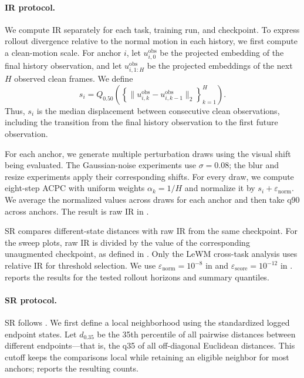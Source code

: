 \documentclass[10pt]{article}
\begin{document}
\paragraph{IR protocol.}
We compute IR separately for each task, training run, and checkpoint. To
express rollout divergence relative to the normal motion in each history, we
first compute a clean-motion scale. For anchor $i$, let
$u^{\mathrm{obs}}_{i,0}$ be the projected embedding of the final history
observation, and let $u^{\mathrm{obs}}_{i,1:H}$ be the projected embeddings of
the next $H$ observed clean frames. We define
\begin{equation}
s_i
=Q_{0.50}\!\left(
\left\{\|u^{\mathrm{obs}}_{i,k}-u^{\mathrm{obs}}_{i,k-1}\|_2
\right\}_{k=1}^{H}
\right).
\label{eq:clean-transition-scale}
\end{equation}
Thus, $s_i$ is the median displacement between consecutive clean observations,
including the transition from the final history observation to the first
future observation.

For each anchor, we generate multiple perturbation draws using the visual
shift being evaluated. The Gaussian-noise experiments use $\sigma=0.08$; the
blur and resize experiments apply their corresponding shifts. For every draw,
we compute eight-step ACPC with uniform weights $\alpha_k=1/H$ and normalize it
by $s_i+\varepsilon_{\mathrm{norm}}$. We average the normalized values across
draws for each anchor and then take q90 across anchors. The result is raw IR in
.

SR compares different-state distances with raw IR from the same checkpoint.
For the sweep plots, raw IR is divided by the value of the corresponding
unaugmented checkpoint, as defined in . Only the LeWM
cross-task analysis uses relative IR for threshold selection. We use
$\varepsilon_{\mathrm{norm}}=10^{-8}$ in
 and
$\varepsilon_{\mathrm{score}}=10^{-12}$ in .
 reports the results for the tested
rollout horizons and summary quantiles.



\paragraph{SR protocol.}
SR follows . We first define a local neighborhood using the
standardized logged endpoint states. Let $d_{0.35}$ be the 35th percentile of
all pairwise distances between different endpoints---that is, the q35 of all off-diagonal Euclidean distances.
This cutoff keeps the comparisons local while retaining an eligible neighbor for most anchors;
 reports the resulting counts.
\end{document}
